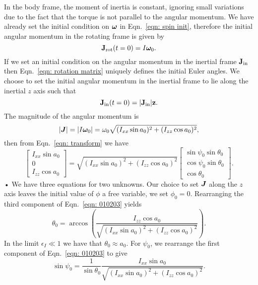 \documentclass[../full_thesis/full_thesis.tex]{subfiles}
\begin{document}
In the body frame, the moment of inertia is constant, ignoring small variations
due to the fact that the torque is not parallel to the angular momentum.
We have already set the initial condition on $\boldsymbol{\omega}$  in Eqn.~\eqref{eqn:
spin init}, therefore the initial angular momentum in the rotating frame is given by
\begin{equation}
  \mathbf{J}_{\textrm{rot}}(t=0) = I \boldsymbol{\omega}_0.
\end{equation}
If we set an initial condition on the angular momentum in the inertial frame
$\mathbf{J}_{\textrm{in}}$ then Eqn.~\eqref{eqn: rotation matrix} uniquely defines the initial
Euler angles. We choose to set the initial angular momentum in the inertial
frame to lie along the inertial $z$ axis such that
\begin{equation}
  \mathbf{J}_{\textrm{in}}(t=0) = |\mathbf{J}_{\textrm{in}}| \mathbf{z}.
\end{equation}
The magnitude of the angular momentum is
\begin{equation}
|\boldsymbol{J}| = |I \boldsymbol{\omega}_{0}|=\omega_{0}\sqrt{(I_{xx}\sin a_{0})^{2} + (I_{zz}\cos a_{0})^{2}},
\end{equation}
then from Eqn.~\eqref{eqn: transform} we have
\begin{equation}
\left[ \begin{array}{c}
I_{xx}\sin a_{0} \\
0 \\
I_{zz} \cos a_{0}
\end{array}\right] =
\sqrt{(I_{xx}\sin a_{0})^{2} + (I_{zz}\cos a_{0})^{2}}
\left[ \begin{array}{c}
\sin \psi_{0} \sin \theta_{0} \\
\cos \psi_{0} \sin \theta_{0} \\
\cos \theta_{0}
\end{array}\right].
\label{eqn: 010203}
\end{equation}•
We have three equations for two unknowns. Our choice to set $\boldsymbol{J}$ along
the $z$ axis leaves the initial value of $\phi$ a free variable,
we set $\phi_{0} = 0$.
Rearranging the third component of Eqn.~\eqref{eqn: 010203} yields
\begin{equation}
\theta_{0} = \arccos\left(\frac{I_{zz}\cos a_{0}}{ \sqrt{(I_{xx}\sin
        a_{0})^{2} + (I_{zz}\cos a_{0})^{2}}} \right).
\label{eqn: theta init}
\end{equation}
In the limit $\epsilon_{I} \ll 1$ we have that $\theta_{0} \approx a_{0}$.
For $\psi_0$, we rearrange the first component of Eqn.~\eqref{eqn: 010203} to
give
\begin{equation}
\sin\psi_{0} =\frac{1}{ \sin\theta_{0}}
\frac{ I_{xx}\sin a_{0}}{\sqrt{(I_{xx}\sin a_{0})^{2} + (I_{zz}\cos a_{0})^{2}}}.
\label{eqn: 8283}
\end{equation}
\end{document}
